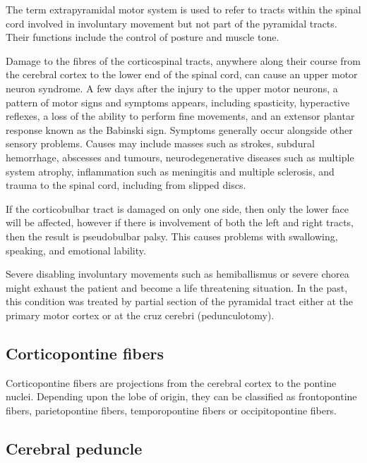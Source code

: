 \documentclass[]{book}
\begin{document}
The term extrapyramidal motor system is used to refer to tracts within the spinal cord involved in involuntary movement but not part of the pyramidal tracts. Their functions include the control of posture and muscle tone.

Damage to the fibres of the corticospinal tracts, anywhere along their course from the cerebral cortex to the lower end of the spinal cord, can cause an upper motor neuron syndrome. A few days after the injury to the upper motor neurons, a pattern of motor signs and symptoms appears, including spasticity, hyperactive reflexes, a loss of the ability to perform fine movements, and an extensor plantar response known as the Babinski sign. Symptoms generally occur alongside other sensory problems. Causes may include masses such as strokes, subdural hemorrhage, abscesses and tumours, neurodegenerative diseases such as multiple system atrophy, inflammation such as meningitis and multiple sclerosis, and trauma to the spinal cord, including from slipped discs.

If the corticobulbar tract is damaged on only one side, then only the lower face will be affected, however if there is involvement of both the left and right tracts, then the result is pseudobulbar palsy. This causes problems with swallowing, speaking, and emotional lability.

Severe disabling involuntary movements such as hemiballismus or severe chorea might exhaust the patient and become a life threatening situation. In the past, this condition was treated by partial section of the pyramidal tract either at the primary motor cortex or at the cruz cerebri (pedunculotomy).

\hypertarget{corticopontine-fibers}{%
\subsection{Corticopontine fibers}\label{corticopontine-fibers}}

Corticopontine fibers are projections from the cerebral cortex to the pontine nuclei. Depending upon the lobe of origin, they can be classified as frontopontine fibers, parietopontine fibers, temporopontine fibers or occipitopontine fibers.

\hypertarget{cerebral-peduncle}{%
\subsection{Cerebral peduncle}\label{cerebral-peduncle}}
\end{document}
